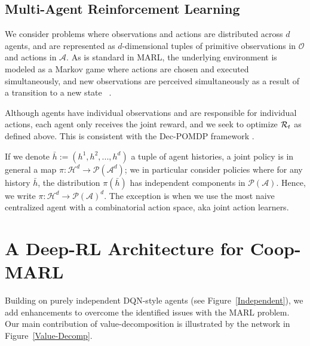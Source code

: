 \documentclass{article}
\def\R{{\cal R}}
\begin{document}
\subsection{Multi-Agent Reinforcement Learning}


We consider problems where observations and actions are distributed across $d$ agents, and are represented as $d$-dimensional tuples of primitive observations in $\mathcal{O}$ and actions in $\mathcal{A}$. As is standard in MARL, the underlying environment is modeled as a Markov game where actions are chosen and executed simultaneously, and new observations are perceived simultaneously as a result of a transition to a new state ~\citep{Littman94,Littman01,HuW03,Busoniu08MARL}.

Although agents have individual observations and are responsible for individual actions, each agent only receives the joint reward, and we seek to optimize $\R_t$ as defined above. This is consistent with the Dec-POMDP framework \citep{OliehoekSV08, OliehoekAmato16book}. 


If we denote $\bar h := (h^1,h^2,...,h^d)$ a tuple of agent histories, a joint policy is in general a map $\pi: \mathcal{H}^d \to \mathcal{P}(\mathcal{A}^d)$; we in particular consider policies where for any history $\bar{h}$, the distribution $\pi(\bar{h})$ has independent components in $\mathcal{P}(\mathcal{A})$. Hence, we write  $\pi:\mathcal{H}^d\to \mathcal{P}(\mathcal{A})^d$. The exception is when we use the most naive centralized agent with a combinatorial action space, aka joint action learners. 





\section{A Deep-RL Architecture for Coop-MARL}


Building on purely independent DQN-style agents (see Figure~\ref{Independent}), we add enhancements to overcome the identified issues with the MARL problem. Our main contribution of value-decomposition is illustrated by the network in Figure~\ref{Value-Decomp}.
\end{document}
